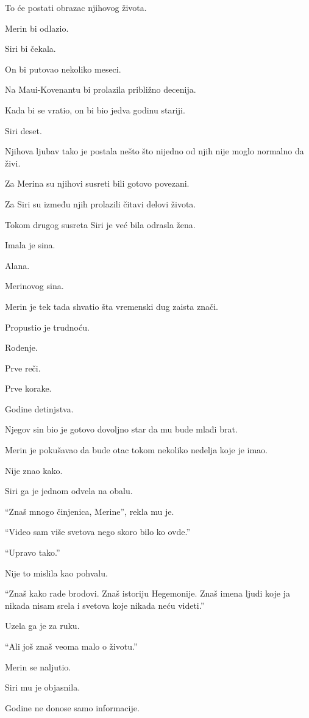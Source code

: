 \bigskip

To će postati obrazac njihovog života.

Merin bi odlazio.

Siri bi čekala.

On bi putovao nekoliko meseci.

Na Maui-Kovenantu bi prolazila približno decenija.

Kada bi se vratio, on bi bio jedva godinu stariji.

Siri deset.

Njihova ljubav tako je postala nešto što nijedno od njih nije moglo normalno da živi.

Za Merina su njihovi susreti bili gotovo povezani.

Za Siri su između njih prolazili čitavi delovi života.

Tokom drugog susreta Siri je već bila odrasla žena.

Imala je sina.

Alana.

Merinovog sina.

Merin je tek tada shvatio šta vremenski dug zaista znači.

Propustio je trudnoću.

Rođenje.

Prve reči.

Prve korake.

Godine detinjstva.

Njegov sin bio je gotovo dovoljno star da mu bude mlađi brat.

Merin je pokušavao da bude otac tokom nekoliko nedelja koje je imao.

Nije znao kako.

Siri ga je jednom odvela na obalu.

``Znaš mnogo činjenica, Merine'', rekla mu je.

``Video sam više svetova nego skoro bilo ko ovde.''

``Upravo tako.''

Nije to mislila kao pohvalu.

``Znaš kako rade brodovi. Znaš istoriju Hegemonije. Znaš imena ljudi koje ja nikada nisam srela i svetova koje nikada neću videti.''

Uzela ga je za ruku.

``Ali još znaš veoma malo o životu.''

Merin se naljutio.

Siri mu je objasnila.

Godine ne donose samo informacije.

